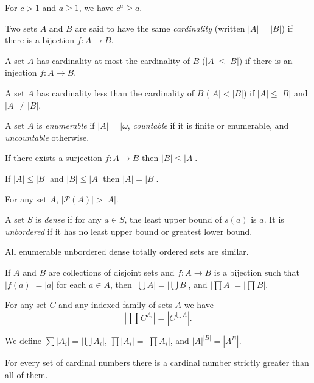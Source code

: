 \begin{prop}
    For $c>1$ and $a\ge 1$, we have $c^a\ge a$.
\end{prop}
\begin{defn}
  Two sets $A$ and $B$ are said to have the same \emph{cardinality} (written
  $|A|=|B|$) if there is a bijection $f:A\to B$.

  A set $A$ has cardinality at most the cardinality of $B$ ($|A|\le|B|$) if
  there is an injection $f:A\to B$.

  A set $A$ has cardinality less than the cardinality of $B$ ($|A|<|B|$) if
  $|A|\le|B|$ and $|A|\ne|B|$.

  A set $A$ is \emph{enumerable} if $|A|=|\omega$, \emph{countable} if it is
  finite or enumerable, and \emph{uncountable} otherwise.
\end{defn}
\begin{prop}
  If there exists a surjection $f:A\to B$ then $|B|\le|A|$.
\end{prop}
\begin{thm}
  If $|A|\le|B|$ and $|B|\le|A|$ then $|A|=|B|$.
\end{thm}
\begin{thm}[Cantor]
  For any set $A$, $|\mathcal P(A)|>|A|$.
\end{thm}
\begin{defn}
    A set $S$ is \emph{dense} if for any $a\in S$, the least upper bound of 
    $s(a)$ is $a$. It is \emph{unbordered} if it has no least upper bound or
    greatest lower bound.
\end{defn}
\begin{prop}
    All enumerable unbordered dense totally ordered sets are similar.
\end{prop}
\begin{prop}
    If $A$ and $B$ are collections of disjoint sets and $f:A\to B$ is a
    bijection such that $|f(a)|=|a|$ for each $a\in A$, then
    $\left|\bigcup A\right|=\left|\bigcup
    B\right|$, and $\left|\prod A\right|=\left|\prod B\right|$.
\end{prop}
\begin{prop}
    For any set $C$ and any indexed family of sets $A$ we have
    \[\left|\prod C^{A_i}\right|=\left|C^{\bigcup A}\right|.\]
\end{prop}
\begin{defn}
    We define $\sum|A_i|=\left|\bigcup A_i\right|$, $\prod|A_i|=\left|\prod
    A_i\right|$, and $|A|^{|B|}=|A^B|$.
\end{defn}
\begin{prop}
    For every set of cardinal numbers there is a cardinal number strictly
    greater than all of them.
\end{prop}
